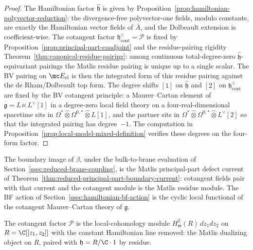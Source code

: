 \documentclass[11pt]{memoir}
\begin{document}
\begin{proof}
  The Hamiltonian factor $\widehat{\mathfrak h}$ is given by
  Proposition~\ref{prop:hamiltonian-polyvector-reduction}: the
  divergence-free polyvector-one fields, modulo constants, are exactly
  the Hamiltonian vector fields of $\bar A$, and the Dolbeault extension is
  coefficient-wise.  The cotangent factor $\mathfrak h^\vee_{\mathrm{cont}}=
  \mathcal P$ is fixed by Proposition~\ref{prop:principal-part-coadjoint}
  and the residue-pairing rigidity
  Theorem~\ref{thm:canonical-residue-pairing}: among continuous
  total-degree-zero $\widehat{\mathfrak h}$-equivariant pairings the
  Matlis residue pairing is unique up to a single scalar.  The BV
  pairing on $\mc E_{\mathrm{cl}}$ is then the integrated form of this
  residue pairing against the de Rham/Dolbeault top form.  The degree
  shifts $[1]$ on $\widehat{\mathfrak h}$ and $[2]$ on
  $\mathfrak h^\vee_{\mathrm{cont}}$ are fixed by the BV cotangent
  principle: a Maurer--Cartan element of
  $\mathfrak g=L\ltimes L^\vee[1]$ in a degree-zero local field theory
  on a four-real-dimensional spacetime sits in
  $\Omega^*\widehat\otimes\Omega^{0,*}\widehat\otimes L[1]$, and the
  partner sits in $\Omega^*\widehat\otimes\Omega^{0,*}\widehat\otimes
  L^\vee[2]$ so that the integrated pairing has degree~$-1$.  The
  computation in
  Proposition~\ref{prop:local-model-mixed-definition} verifies these
  degrees on the four-form factor.
\end{proof}

The boundary image of $\beta$, under the bulk-to-brane evaluation of
Section~\ref{ssec:reduced-brane-coupling}, is the Matlis principal-part
defect current of
Theorem~\ref{thm:reduced-principal-part-boundary-current}: cotangent
fields pair with that current and the cotangent module is the
Matlis residue module.  The BF action of
Section~\ref{ssec:hamiltonian-bf-action} is the cyclic local functional
of the cotangent Maurer--Cartan theory of \(\mathfrak g\).

\begin{rmk}\label{rmk:cotangent-matlis-dualizing}
  The cotangent factor $\mathcal P$ is the local-cohomology module
  $H^2_{\mathfrak m}(R)\,dz_1 dz_2$ on $R=\C[[z_1,z_2]]$ with the
  constant Hamiltonian line removed: the Matlis dualizing object on
  $R$, paired with $\mathfrak h=R/\C\cdot1$ by residue.
\end{rmk}
\end{document}
